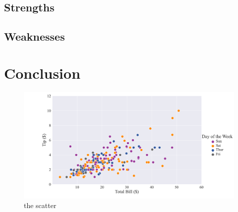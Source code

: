 \documentclass{HZNUMCM}
\begin{document}
    \subsection{Strengths}
    \subsection{Weaknesses}

  \section{Conclusion}
  \begin{figure}[ht]
    \centering
    \includegraphics[width=\linewidth]{images/scatter.pdf} %
    \caption{the scatter}
    \label{fig:image1}
  \end{figure}
\end{document}
